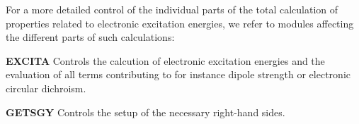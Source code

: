 For a more detailed control of the individual parts of the total
calculation of properties related to electronic excitation energies,
we refer to modules affecting the different parts of such
calculations:

\begin{list}{}{\itemsep 0.10cm \parsep 0.0cm}
\item[\bf *EXCITA] Controls the calcution of electronic excitation
energies and the evaluation of all terms contributing to for instance
dipole strength or electronic circular dichroism.

\item[\bf *GETSGY] Controls the setup of the necessary right-hand
sides.
\end{list}
